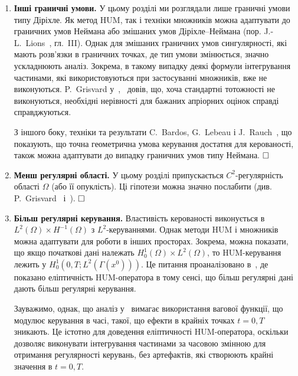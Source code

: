 \begin{enumerate}
Задача мінімізації~(\ref{eqII79}) має єдиний розв'язок, який власне і є керуванням, отриманим у теоремі~\ref{theorem:II.2.3}, що його дає HUM.
Насправді, HUM послідовно дає оптимальні керування мінімальної норми у відповідному функціональному середовищі в різних ситуаціях, де він застосовується (пор. J.-L.~Lions~\cite{lions1988controlabilite}, гл.~VIII).
$\hfill \square$

\item \textbf{Інші граничні умови.}  У цьому розділі ми розглядали лише граничні умови типу Діріхле. Як метод HUM, так і техніки множників можна адаптувати до граничних умов Неймана або змішаних умов Діріхле–Неймана (пор. J.-L.~Lions~\cite{lions1988controlabilite}, гл.~III). Однак для змішаних граничних умов сингулярності, які мають розв'язки в граничних точках, де тип умови змінюється, значно ускладнюють аналіз. Зокрема, в такому випадку деякі формули інтегрування частинами, які використовуються при застосуванні множників, вже не виконуються. P.~Grisvard у~\cite{grisvard1987controlabilite305},~\cite{grisvard1989controlabilite} довів, що, хоча стандартні тотожності не виконуються, необхідні нерівності для бажаних апріорних оцінок справді справджуються.

З іншого боку, техніки та результати C.~Bardos, G.~Lebeau і J.~Rauch~\cite{bardos1992sharp}, що показують, що точна геометрична умова керування достатня для керованості, також можна адаптувати до випадку граничних умов типу Неймана.
$\hfill \square$

\item \textbf{Менш регулярні області.} У цьому розділі припускається $C^2$-регулярність області $\Omega$ (або її опуклість). Ці гіпотези можна значно послабити (див. P.~Grisvard~\cite{grisvard1987controlabilite} і~\cite{grisvard1989controlabilite}).
$\hfill \square$

\item \textbf{Більш регулярні керування.} Властивість керованості виконується в $L^2(\Omega) \times H^{-1}(\Omega)$ з $L^2$-керуваннями. Однак методи HUM і множників можна адаптувати для роботи в інших просторах. Зокрема, можна показати, що якщо початкові дані належать $H_0^1(\Omega) \times L^2(\Omega)$, то HUM-керування лежить у $H_0^1(0, T; L^2(\Gamma(x^0)))$. Це питання проаналізовано в~\cite{ervedoza2010zuazua}, де показано еліптичність HUM-оператора в тому сенсі, що більш регулярні дані дають більш регулярні керування.

Зауважимо, однак, що аналіз у~\cite{ervedoza2010zuazua} вимагає використання вагової функції, що модулює керування в часі, такої, що ефекти в крайніх точках $t=0, T$ зникають. Це істотно для доведення еліптичності HUM-оператора, оскільки дозволяє виконувати інтегрування частинами за часовою змінною для отримання регулярності керувань, без артефактів, які створюють крайні значення в $t=0, T$.


\end{enumerate}
